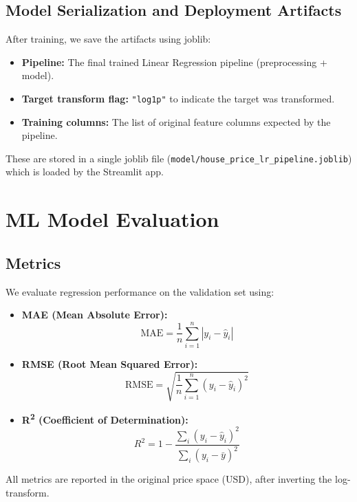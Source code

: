 \documentclass[11pt,a4paper]{article}
\begin{document}
\subsection{Model Serialization and Deployment Artifacts}

After training, we save the artifacts using joblib:

\begin{itemize}[leftmargin=*]
    \item \textbf{Pipeline:} The final trained Linear Regression pipeline (preprocessing + model).
    \item \textbf{Target transform flag:} \texttt{"log1p"} to indicate the target was transformed.
    \item \textbf{Training columns:} The list of original feature columns expected by the pipeline.
\end{itemize}

These are stored in a single joblib file (\texttt{model/house\_price\_lr\_pipeline.joblib}) which is loaded by the Streamlit app.

\section{ML Model Evaluation}
\label{sec:ml-eval}

\subsection{Metrics}

We evaluate regression performance on the validation set using:

\begin{itemize}[leftmargin=*]
    \item \textbf{MAE (Mean Absolute Error):}
    \[
    \text{MAE} = \frac{1}{n} \sum_{i=1}^n \left| y_i - \hat{y}_i \right|
    \]
    \item \textbf{RMSE (Root Mean Squared Error):}
    \[
    \text{RMSE} = \sqrt{\frac{1}{n} \sum_{i=1}^n \left( y_i - \hat{y}_i \right)^2}
    \]
    \item \textbf{R\textsuperscript{2} (Coefficient of Determination):}
    \[
    R^2 = 1 - \frac{\sum_i (y_i - \hat{y}_i)^2}{\sum_i (y_i - \bar{y})^2}
    \]
\end{itemize}

All metrics are reported in the original price space (USD), after inverting the log-transform.
\end{document}
